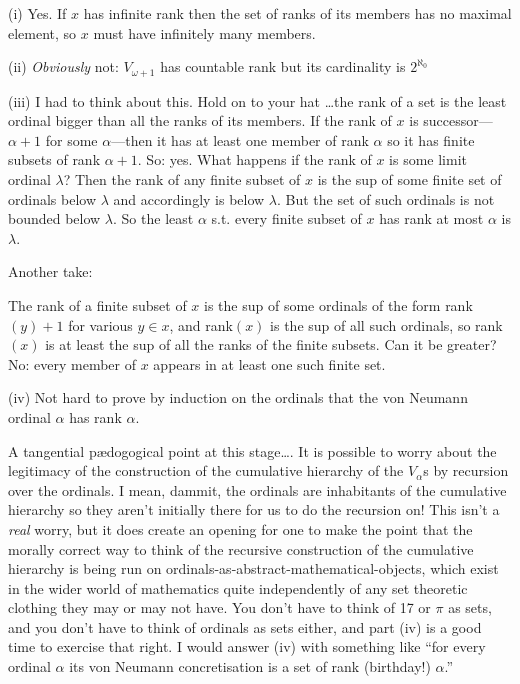 \documentclass{book}
\begin{document}
(i) Yes. If $x$ has infinite rank then the set of ranks of its members
has no maximal element, so $x$ must have infinitely many members.

\smallskip

(ii)  {\sl Obviously} not:  $V_{\omega +1}$ has countable rank but its
cardinality is $2^{\aleph_0}$

\smallskip

(iii) I had to think about this.  Hold on to your hat \ldots the rank
of a set is the least ordinal bigger than all the ranks of its
members.  If the rank of $x$ is successor---$\alpha+1$ for some
$\alpha$---then it has at least one member of rank $\alpha$ so it has
finite subsets of rank $\alpha + 1$.  So: yes.  What happens if the
rank of $x$ is some limit ordinal $\lambda$?  Then the rank of any
finite subset of $x$ is the sup of some finite set of ordinals below
$\lambda$ and accordingly is below $\lambda$.  But the set of such
ordinals is not bounded below $\lambda$. So the least $\alpha$
s.t. every finite subset of $x$ has rank at most $\alpha$ is
$\lambda$.

Another take:


The rank of a finite subset of $x$ is the sup of some ordinals of the
form rank$(y) +1$ for various $y \in x$, and rank$(x)$ is the sup of
all such ordinals, so rank$(x)$ is at least the sup of all the ranks
of the finite subsets.  Can it be greater? No: every member of $x$
appears in at least one such finite set.

\smallskip

(iv) Not hard to prove by induction on the ordinals that the von Neumann ordinal $\alpha$ has rank $\alpha$.

A tangential p{\ae}dogogical point at this stage\ldots.  It is
possible to worry about the legitimacy of the construction of the
cumulative hierarchy of the $V_\alpha$s by recursion over the
ordinals.  I mean, dammit, the ordinals are inhabitants of the
cumulative hierarchy so they aren't initially there for us to do the
recursion on!  This isn't a {\sl real} worry, but it does create an
opening for one to make the point that the morally correct way to
think of the recursive construction of the cumulative hierarchy is
being run on ordinals-as-abstract-mathematical-objects, which exist in
the wider world of mathematics quite independently of any set
theoretic clothing they may or may not have.  You don't have to think
of 17 or $\pi$ as sets, and you don't have to think of ordinals as
sets either, and part (iv) is a good time to exercise that right.  I
would answer (iv) with something like ``for every ordinal $\alpha$ its
von Neumann concretisation is a set of rank (birthday!) $\alpha$.''
\end{document}
